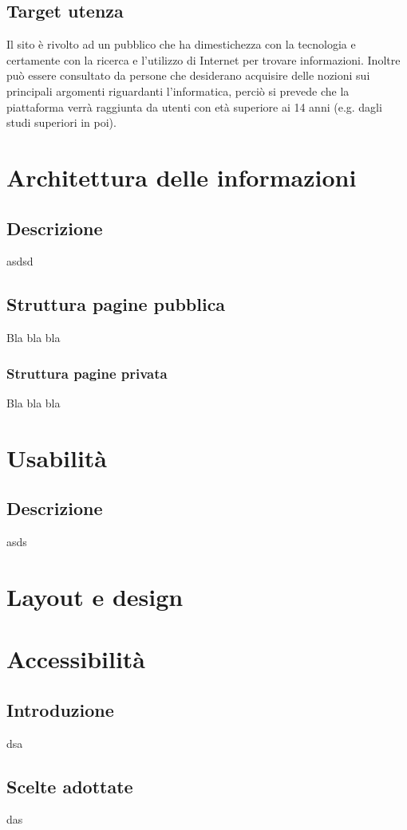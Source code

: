 \documentclass[12pt]{article}
\begin{document}
	\subsection{Target utenza}
		Il sito è rivolto ad un pubblico che ha dimestichezza con la tecnologia e certamente con la ricerca e l'utilizzo di Internet per trovare informazioni. Inoltre può essere consultato da persone che desiderano acquisire delle nozioni sui principali argomenti riguardanti l'informatica, perciò si prevede che la piattaforma verrà raggiunta da utenti con età superiore ai 14 anni (e.g. dagli studi superiori in poi).
		
	\section{Architettura delle informazioni}
	\subsection{Descrizione}
	asdsd
	\subsection{Struttura pagine pubblica}
	Bla bla bla
	\subsubsection{Struttura pagine privata}
	Bla bla bla

	\section{Usabilità}
	\subsection{Descrizione}
	asds
	\section{Layout e design}

	\section{Accessibilità}
	\subsection{Introduzione}
	dsa
	\subsection{Scelte adottate}
	das
\end{document}
